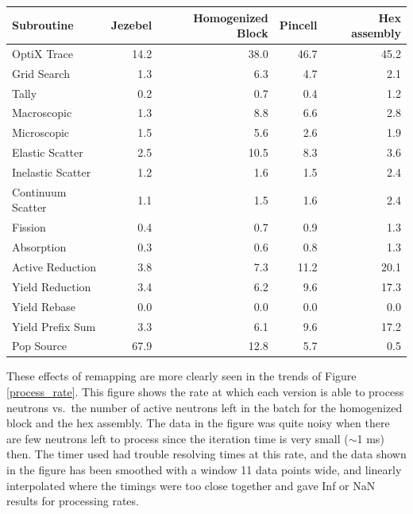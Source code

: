 \begin{table}[h!]
\begin{tabular}{| l | r  | r | r | r |}
 \hline
Subroutine         & Jezebel & Homogenized Block & Pincell & Hex assembly  \\
\hline \hline
 OptiX Trace       & 14.2       &      38.0            &   46.7    &    45.2     \\ \hline
 Grid Search       &  1.3      &        6.3                 &  4.7     &     2.1      \\ \hline
 Tally                   &  0.2      &         0.7               &   0.4    &    1.2       \\ \hline
 Macroscopic      &  1.3     &          8.8               &  6.6      &    2.8     \\ \hline
 Microscopic       &  1.5      &          5.6               &  2.6     &    1.9       \\ \hline
 Elastic Scatter   &  2.5      &        10.5                 &   8.3    &   3.6      \\ \hline
 Inelastic Scatter & 1.2       &        1.6                  &  1.5    &    2.4    \\ \hline
 Continuum Scatter & 1.1  &         1.5                 &   1.6   &    2.4   \\ \hline
 Fission               &  0.4      &         0.7                 &   0.9   &    1.3      \\ \hline
 Absorption          & 0.3       &         0.6                 &   0.8   &    1.3      \\ \hline
Active Reduction  &  3.8      &        7.3                  &   11.2   &  20.1        \\ \hline
 Yield Reduction  &   3.4     &        6.2                 &  9.6    &    17.3     \\ \hline
 Yield Rebase     &    0.0     &       0.0                   &   0.0  &    0.0    \\ \hline
 Yield Prefix Sum &   3.3    &       6.1                    &  9.6   &    17.2    \\ \hline
 Pop Source         &  67.9     &     12.8                    & 5.7    &    0.5    \\ 
\hline
\end{tabular}
\end{table}


These effects of remapping are more clearly seen in the trends of Figure \ref{process_rate}.  This figure shows the rate at which each version is able to process neutrons vs.\ the number of active neutrons left in the batch for the homogenized block and the hex assembly.  The data in the figure was quite noisy when there are few neutrons left to process since the iteration time is very small ($\sim$1 ms) then.  The timer used had trouble resolving times at this rate, and the data shown in the figure has been smoothed with a window 11 data points wide,%
 and linearly interpolated where the timings were too close together and gave Inf or NaN results for processing rates.  
 
